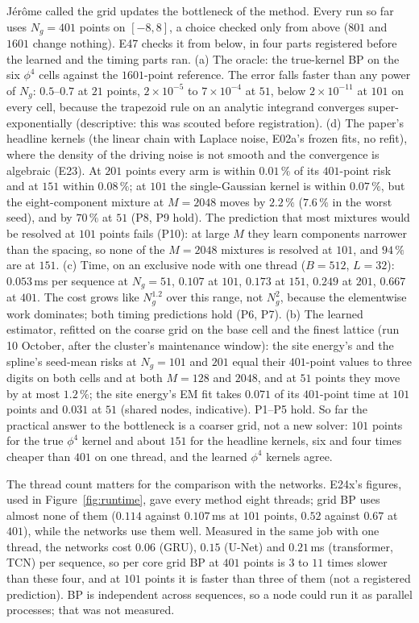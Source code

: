 \documentclass[10pt,a4paper]{article}
\theoremstyle{plain}
\theoremstyle{remark}
\begin{document}
Jérôme called the grid updates the bottleneck of the method. Every run so far uses $N_g=401$ points on $[-8,8]$, a choice checked only from above ($801$ and $1601$ change nothing). E47 checks it from below, in four parts registered before the learned and the timing parts ran.
(a) The oracle: the true-kernel BP on the six $\phi^4$ cells against the $1601$-point reference. The error falls faster than any power of $N_g$: $0.5$--$0.7$ at $21$ points, $2\times10^{-5}$ to $7\times10^{-4}$ at $51$, below $2\times10^{-11}$ at $101$ on every cell, because the trapezoid rule on an analytic integrand converges super-exponentially (descriptive: this was scouted before registration).
(d) The paper's headline kernels (the linear chain with Laplace noise, E02a's frozen fits, no refit), where the density of the driving noise is not smooth and the convergence is algebraic (E23). At $201$ points every arm is within $0.01\,\%$ of its $401$-point risk and at $151$ within $0.08\,\%$; at $101$ the single-Gaussian kernel is within $0.07\,\%$, but the eight-component mixture at $M=2048$ moves by $2.2\,\%$ ($7.6\,\%$ in the worst seed), and by $70\,\%$ at $51$ (P8, P9 hold). The prediction that most mixtures would be resolved at $101$ points fails (P10): at large $M$ they learn components narrower than the spacing, so none of the $M=2048$ mixtures is resolved at $101$, and $94\,\%$ are at $151$.
(c) Time, on an exclusive node with one thread ($B=512$, $L=32$): $0.053$\,ms per sequence at $N_g=51$, $0.107$ at $101$, $0.173$ at $151$, $0.249$ at $201$, $0.667$ at $401$. The cost grows like $N_g^{1.2}$ over this range, not $N_g^2$, because the elementwise work dominates; both timing predictions hold (P6, P7).
(b) The learned estimator, refitted on the coarse grid on the base cell and the finest lattice (run 10 October, after the cluster's maintenance window): the site energy's and the spline's seed-mean risks at $N_g=101$ and $201$ equal their $401$-point values to three digits on both cells and at both $M=128$ and $2048$, and at $51$ points they move by at most $1.2\,\%$; the site energy's EM fit takes $0.071$ of its $401$-point time at $101$ points and $0.031$ at $51$ (shared nodes, indicative). P1--P5 hold.
So far the practical answer to the bottleneck is a coarser grid, not a new solver: $101$ points for the true $\phi^4$ kernel and about $151$ for the headline kernels, six and four times cheaper than $401$ on one thread, and the learned $\phi^4$ kernels agree.

The thread count matters for the comparison with the networks. E24x's figures, used in Figure~\ref{fig:runtime}, gave every method eight threads; grid BP uses almost none of them ($0.114$ against $0.107$\,ms at $101$ points, $0.52$ against $0.67$ at $401$), while the networks use them well. Measured in the same job with one thread, the networks cost $0.06$ (GRU), $0.15$ (U-Net) and $0.21$\,ms (transformer, TCN) per sequence, so per core grid BP at $401$ points is $3$ to $11$ times slower than these four, and at $101$ points it is faster than three of them (not a registered prediction). BP is independent across sequences, so a node could run it as parallel processes; that was not measured.
\end{document}
